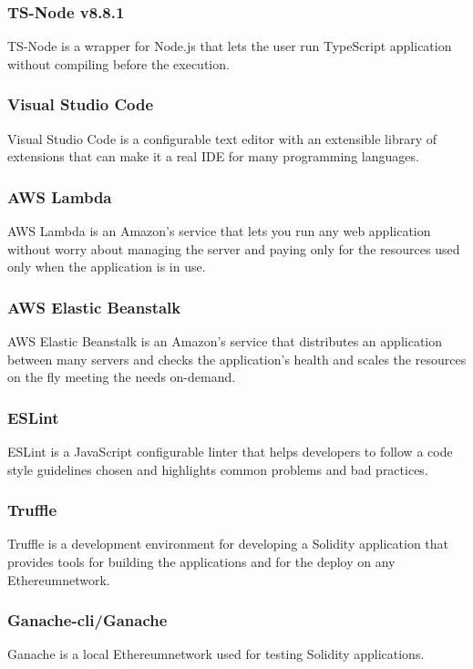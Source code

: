 \subsubsection*{TS-Node v8.8.1}
TS-Node is a wrapper for Node.js that lets the user run TypeScript application without compiling before the execution.

\subsubsection*{Visual Studio Code}
Visual Studio Code is a configurable text editor with an extensible library of extensions that can make it a real IDE for many programming languages.

\subsubsection*{AWS Lambda}
AWS Lambda is an Amazon’s service that lets you run any web application without worry about managing the server and paying only for the resources used only when the application is in use.

\subsubsection*{AWS Elastic Beanstalk}
AWS Elastic Beanstalk is an Amazon’s service that distributes an application between many servers and checks the application’s health and scales the resources on the fly meeting the needs on-demand.

\subsubsection*{ESLint}
ESLint is a JavaScript configurable linter that helps developers to follow a code style guidelines chosen and highlights common problems and bad practices.

\subsubsection*{Truffle}
Truffle is a development environment for developing a Solidity application that provides tools for building the applications and for the deploy on any Ethereum\glo network.

\subsubsection*{Ganache-cli/Ganache}
Ganache is a local Ethereum\glo network used for testing Solidity applications.


